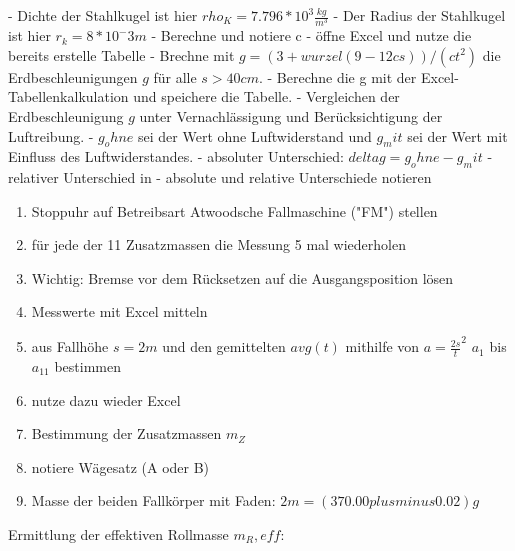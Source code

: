 \documentclass{protokoll}
\begin{document}
- Dichte der Stahlkugel ist hier $rho_K = 7.796 * 10^3 \frac{kg}{m^3}$
- Der Radius der Stahlkugel ist hier $ r_k = 8 * 10^-3 m $
- Berechne und notiere c 
- öffne Excel und nutze die bereits erstelle Tabelle
- Brechne mit $ g = (3 + wurzel(9 - 12cs))/(ct^2) $ die Erdbeschleunigungen $g$ für alle $s > 40cm$.
- Berechne die g mit der Excel-Tabellenkalkulation und speichere die Tabelle.
- Vergleichen der Erdbeschleunigung $g$ unter Vernachlässigung und Berücksichtigung der Luftreibung.
- $g_ohne$ sei der Wert ohne Luftwiderstand und $g_mit$ sei der Wert mit Einfluss des Luftwiderstandes.
- absoluter Unterschied: $ delta g = g_ohne - g_mit $
- relativer Unterschied in %
- absolute und relative Unterschiede notieren


\begin{enumerate}
\item Stoppuhr auf Betreibsart Atwoodsche Fallmaschine ("FM") stellen
\item für jede der 11 Zusatzmassen die Messung 5 mal wiederholen
\item Wichtig: Bremse vor dem Rücksetzen auf die Ausgangsposition lösen
\item Messwerte mit Excel mitteln
\item aus Fallhöhe $s = 2m$ und den gemittelten $avg(t)$ mithilfe von $ a = \frac{2s}{t}^2 $
$a_1$ bis $a_11$ bestimmen
\item nutze dazu wieder Excel
\item Bestimmung der Zusatzmassen $m_Z$
\item notiere Wägesatz (A oder B)
\item Masse der beiden Fallkörper mit Faden: $2m = (370.00 plusminus 0.02)g$ 
\end{enumerate}

Ermittlung der effektiven Rollmasse $m_R,eff$:
\end{document}
